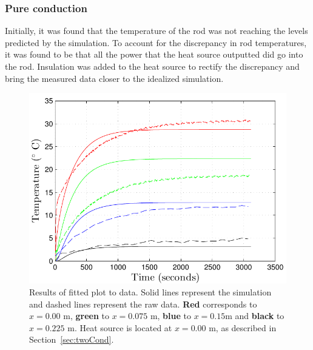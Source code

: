 \documentclass[10pt,aps,prb,twocolumn, nofootinbib]{revtex4-1}
\begin{document}
\subsubsection{\label{sec:threeCond}Pure conduction}

Initially, it was found that the temperature of the rod was not reaching the levels predicted by the simulation. To account for the discrepancy in rod temperatures, it was found to be that all the power that the heat source outputted did go into the rod. Insulation was added to the heat source to rectify the discrepancy and bring the measured data closer to the idealized simulation. 

\begin{figure}[h]
\centering
\includegraphics[width=1.0\linewidth]{pureconduction}
\caption{Results of fitted plot to data. Solid lines represent the simulation and dashed lines represent the raw data. {\color{red}\textbf{Red}} corresponds to $x = 0.00$ m, {\color{green}\textbf{green}} to $x = 0.075$ m, {\color{blue}\textbf{blue}} to $x = 0.15$m and \textbf{black} to $x = 0.225$ m. Heat source is located at $x= 0.00$ m, as described in Section~\ref{sec:twoCond}.}
\label{fig:pureconduction}
\end{figure}
\end{document}
